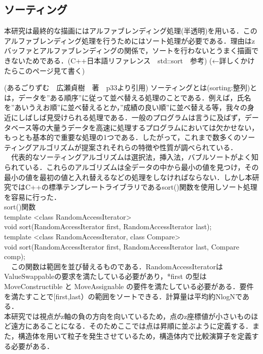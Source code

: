 \documentclass[11pt]{jreport}
\begin{document}
\subsection{ソーティング}
本研究は最終的な描画にはアルファブレンディング処理(半透明)を用いる．このアルファブレンディング処理を行うためにはソート処理が必要である．理由はzバッファとアルファブレンディングの関係で，ソートを行わないとうまく描画できないためである．(C++日本語リファレンス　std::sort　参考)
(←詳しくかけたらこのページ見て書く)

(あるごりずむ　広瀬貞樹　著　p33より引用)
ソーティングとは(sorting:整列)とは，データを”ある順序”に従って並べ替える処理のことである．例えば，氏名を”あいうえお順”に並べ替えるとか，”成績の良い順”に並べ替える等，我々の身近にしばしば見受けられる処理である．一般のプログラムは言うに及ばず，データベース等の大量うデータを高速に処理するプログラムにおいては欠かせない，もっとも基本的で重要な処理の1つである．したがって，これまで数多くのソーティングアルゴリズムが提案されそれらの特徴や性質が調べられている．\\
　代表的なソーティングアルゴリズムは選択法，挿入法，バブルソートがよく知られている．これらのアルゴリズムは全データの中から最小の値を見つけ，その最小の値を最初の値と入れ替えるなどの処理をしなければならない．しかし本研究ではC++の標準テンプレートライブラリであるsort()関数を使用しソート処理を容易に行った．\\
sort()関数\\
  template <class RandomAccessIterator>\\
  void sort(RandomAccessIterator first, RandomAccessIterator last);\\
  template <class RandomAccessIterator, class Compare>\\
  void sort(RandomAccessIterator first, RandomAccessIterator last, Compare comp);\\
　この関数は範囲を並び替えるものである．RandomAccessIteratorはValueSwappableの要求を満たしている必要があり，*first の型は MoveConstructible と MoveAssignable の要件を満たしている必要がある．要件を満たすことで[first,last）の範囲をソートできる．計算量は平均約NlogNである．\\
本研究では視点がz軸の負の方向を向いているため，点のz座標値が小さいものほど遠方にあることになる．そのためここでは点は昇順に並ぶように定義する．また，構造体を用いて粒子を発生させているため，構造体内で比較演算子を定義する必要がある．
\end{document}

